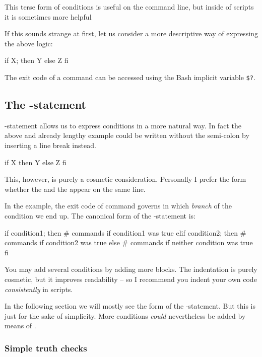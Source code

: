\documentclass{olli-handout}
\begin{document}
This terse form of conditions is useful on the command line, but inside of scripts it is sometimes more helpful

If this sounds strange at first, let us consider a more descriptive way of expressing the above logic:

\begin{lstbash}
if X; then
  Y
else
  Z
fi
\end{lstbash}

The exit code of a command can be accessed using the Bash implicit variable \verb|$?|.

\subsection{The -statement}

-statement allows us to express conditions in a more natural way. In fact the above and already lengthy example could be written without the semi-colon by inserting a line break instead.

\begin{lstbash}
if X
then
Y
else
Z
fi
\end{lstbash}

This, however, is purely a cosmetic consideration. Personally I prefer the form whether the  and the  appear on the same line.

In the example, the exit code of command  governs in which \emph{branch} of the condition we end up. The canonical form of the -statement is:

\begin{lstbash}
if condition1; then
  # commands if condition1 was true
elif condition2; then
  # commands if condition2 was true
else
  # commands if neither condition was true
fi
\end{lstbash}

You may add several conditions by adding more  blocks. The indentation is purely cosmetic, but it improves readability -- so I recommend you indent your own code \emph{consistently} in scripts.

In the following section we will mostly see the  form of the -statement. But this is just for the sake of simplicity. More conditions \emph{could} nevertheless be added by means of .

\subsubsection{Simple truth checks}
\end{document}

